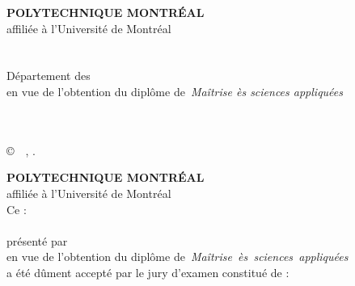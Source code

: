 \documentclass[letterpaper,12pt,oneside,final]{book}
\newcommand\monDipl{Maîtrise ès sciences appliquées}
\newcommand\monDipl{Philosophi\ae{} Doctor}
\begin{document}

\frontmatter
\thispagestyle{empty}%
\begin{center}%
\textbf{POLYTECHNIQUE MONTRÉAL}\\
affiliée à l'Université de Montréal\\
\textbf{\monTitre}\\
\textbf{\MakeUppercase{\monPrenom~\monNom}}\\
Département des~{\monDepartement}\\
 en vue de l'obtention du diplôme de~\emph{\monDipl}\\
\maDiscipline\\
\vskip 0.4in
\moisDepot~\anneeDepot
\end{center}%
\copyright~\monPrenom~\monNom, \anneeDepot.
\newpage\thispagestyle{empty}%
\begin{center}%

\textbf{POLYTECHNIQUE MONTRÉAL}\\
affiliée à l'Université de Montréal\\
Ce :\\
\textbf{\monTitre}\\
présenté
par~\textbf{\mbox{\monPrenom~\MakeUppercase{\monNom}}}\\
en vue de l'obtention du diplôme de~\emph{\mbox{\monDipl}}\\
a été dûment accepté par le jury d'examen constitué de :\end{center}
\monJury
\pagestyle{pagenumber}%
\end{document}
